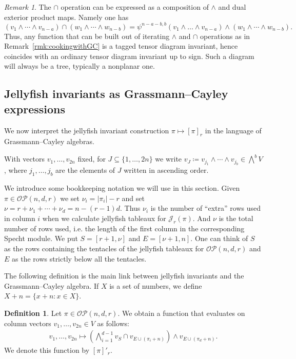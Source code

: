 \documentclass[10pt]{amsart}
\theoremstyle{definition}
\newtheorem{definition}[cdrthm]{Definition}
\theoremstyle{plain}
\theoremstyle{plain}
\theoremstyle{definition}
\theoremstyle{remark}
\newtheorem{remark}[cdrthm]{Remark}
\theoremstyle{plain}
\theoremstyle{plain}
\theoremstyle{plain}
\numberwithin{equation}{section}
\newcommand{\ordsetpart}{\mathcal{OP}}
\begin{document}
\begin{remark}\label{rmk:WLOG}
The $\cap$ operation can be expressed as a composition of $\wedge$ and dual exterior product maps. Namely one has 
\[(v_1 \wedge\cdots\wedge v_{n-a}) \cap (w_1 \wedge \cdots \wedge w_{n-b}) = \psi^{n-a-b,b}(v_1\wedge\dots\wedge v_{n-a}) \wedge (w_1 \wedge \cdots \wedge w_{n-b}).\]
Thus, any function that can be built out of iterating $\wedge$ and $\cap$ operations as in Remark~\ref{rmk:cookingwithGC} is a tagged tensor diagram invariant, hence coincides with an ordinary tensor diagram invariant up to sign. Such a diagram will always be a tree, typically a nonplanar one.
\end{remark}



\subsection{Jellyfish invariants as Grassmann--Cayley expressions}
We now interpret the jellyfish invariant construction $\pi \mapsto [\pi]_r$ in the language of Grassmann--Cayley algebras. 

With vectors $v_1,\dots,v_{2n}$ fixed, for $J \subseteq \{1,\ldots,2n\}$ we write $v_J \coloneqq v_{j_1} \wedge \cdots \wedge v_{j_b} \in \bigwedge^b V$, where $j_1,\dots,j_b$ are the elements of $J$ written in ascending order. 

We introduce some bookkeeping notation we will use in this section. Given $\pi \in \ordsetpart(n,d,r)$ we set $\nu_i = |\pi_i| - r$ and set $\nu = r+\nu_1+\cdots +\nu_d = n-(r-1)d$. Thus $\nu_i$ is the number of ``extra'' rows used in column $i$ when we calculate jellyfish tableaux for $\mathcal{J}_r(\pi)$. And $\nu$ is the total number of rows used, i.e. the length of the first column in the corresponding Specht module. 
We put 
$S = [r+1,\nu]$ and $E = [\nu+1,n]$. One can think of $S$ as the rows containing the tentacles of the jellyfish tableaux for $\mathcal{OP}(n,d,r)$ and $E$ as the rows strictly below all the tentacles.


The following definition is the main link between jellyfish invariants and the Grassmann--Cayley algebra. If $X$ is a set of numbers, we define $X+ n = \{ x + n : x \in X\}$.
\begin{definition}
\label{def:web_inv}
Let $\pi \in \ordsetpart(n,d,r)$. We obtain a function that evaluates on column vectors $v_1,\dots,v_{2n} \in V$ as follows: 
\begin{align}\label{eq:meetjellyfish}
v_1,\dots,v_{2n} \mapsto \left(\bigwedge_{i=1}^{d-1} v_{S} \cap v_{E \cup (\pi_i+n)} \right) \wedge v_{E \cup (\pi_d+n)}.
\end{align}
We denote this function by $[\pi]'_r$. 
\end{definition}
\end{document}
